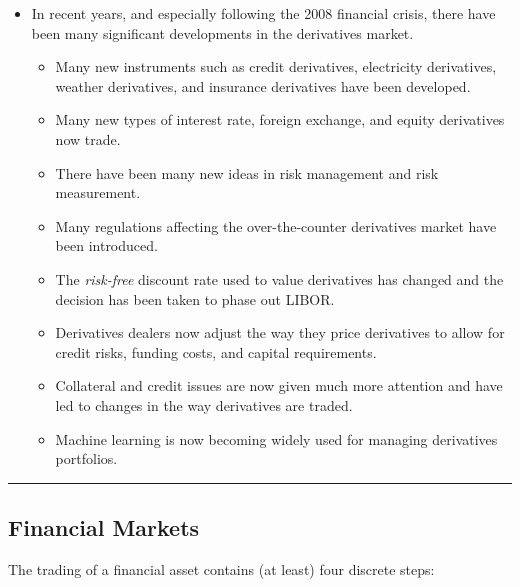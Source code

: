 \documentclass[letterpaper,10pt]{article}
\begin{document}
\begin{itemize}
\item In recent years, and especially following the 2008 financial crisis, there have been many significant developments in the derivatives market.

\begin{itemize}

\item Many new instruments such as credit derivatives, electricity derivatives, weather derivatives, and insurance derivatives have been developed.

\item Many new types of interest rate, foreign exchange, and equity derivatives now trade.

\item There have been many new ideas in risk management and risk measurement.

\item Many regulations affecting the over-the-counter derivatives market have been introduced.

\item The {\em risk-free} discount rate used to value derivatives has changed and the decision has been taken to phase out LIBOR.

\item Derivatives dealers now adjust the way they price derivatives to allow for credit risks, funding costs, and capital requirements.

\item Collateral and credit issues are now given much more attention and have led to changes in the way derivatives are traded.

\item Machine learning is now becoming widely used for managing derivatives portfolios.

\end{itemize}

\end{itemize}

\bigskip

\hrule

\bigskip

\subsection{Financial Markets}

The trading of a financial asset contains (at least) four discrete steps:
\end{document}
